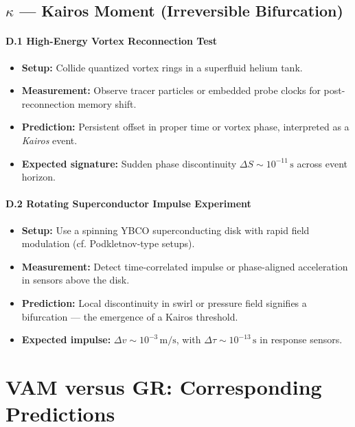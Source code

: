 \documentclass[preprint]{revtex4-2}
\begin{document}
\subsection*{\(\kappa\) --- Kairos Moment (Irreversible Bifurcation)}

\paragraph{D.1 High-Energy Vortex Reconnection Test}
\begin{itemize}
    \item \textbf{Setup:} Collide quantized vortex rings in a superfluid helium tank.
    \item \textbf{Measurement:} Observe tracer particles or embedded probe clocks for post-reconnection memory shift.
    \item \textbf{Prediction:} Persistent offset in proper time or vortex phase, interpreted as a \emph{Kairos} event.
    \item \textbf{Expected signature:} Sudden phase discontinuity \( \Delta S \sim 10^{-11} \, \mathrm{s} \) across event horizon.
\end{itemize}

\paragraph{D.2 Rotating Superconductor Impulse Experiment}
\begin{itemize}
    \item \textbf{Setup:} Use a spinning YBCO superconducting disk with rapid field modulation (cf. Podkletnov-type setups).
    \item \textbf{Measurement:} Detect time-correlated impulse or phase-aligned acceleration in sensors above the disk.
    \item \textbf{Prediction:} Local discontinuity in swirl or pressure field signifies a bifurcation --- the emergence of a Kairos threshold.
    \item \textbf{Expected impulse:} \( \Delta v \sim 10^{-3} \, \mathrm{m/s} \), with \( \Delta \tau \sim 10^{-13} \, \mathrm{s} \) in response sensors.
\end{itemize}

\section{VAM versus GR: Corresponding Predictions}
\label{sec:vam-versus-gr-corresponding-predictions}
\end{document}
